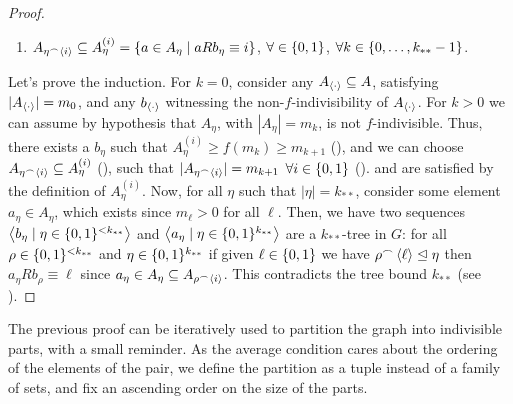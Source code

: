 \begin{lemma}
\begin{proof}
\begin{enumerate}
                    \item\label{itm:existance_of_indivisible_sets.5} $A_{\eta^\frown \left< i \right>} \subseteq A_\eta^{(i)} = \{ a \in A_\eta \mid a R b_\eta \equiv i \}$,
                        $\forall \in \{ 0,1 \}$, $\forall k \in \{ 0, \dots, k_{**}-1 \}$.
                \end{enumerate}
                Let's prove the induction.
                For $k=0$, consider any $A_{\left< \cdot \right>} \subseteq A$, satisfying $|A_{\left< \cdot \right>}| = m_0$, and
                any $b_{\left< \cdot \right>}$ witnessing the non-$f$-indivisibility of $A_{\left< \cdot \right>}$.
                For $k > 0$ we can assume by hypothesis that $A_\eta$, with $|A_\eta| = m_{k}$, is not $f$-indivisible.
                Thus, there exists a $b_\eta$ such that $A_\eta^{(i)} \geq f(m_{k}) \geq m_{k+1}$ (), and we can choose
                $A_{\eta^\frown \left< i \right>} \subseteq A_\eta^{(i)}$ (), such that
                $|A_{\eta^\frown \left< i \right>}| = m_{k+1}$ $\forall i \in \{ 0,1 \}$ ().
                 and  are satisfied by the definition of $A_\eta^{(i)}$.
                Now, for all $\eta$ such that $|\eta| = k_{**}$, consider some element $a_\eta \in A_\eta$, which exists since $m_\ell > 0$
                for all $\ell$.
                Then, we have two sequences $\left< b_\eta \mid \eta \in \{ 0,1 \}^{<k_{**}} \right>$ and $\left< a_\eta \mid \eta \in \{ 0,1 \}^{k_{**}} \right>$
                are a $k_{**}$-tree in $G$: for all $\rho \in \{ 0,1 \}^{<k_{**}}$ and $\eta \in \{ 0,1 \}^{k_{**}}$
                if given $\ell \in \{ 0, 1 \}$ we have $\rho^\frown \left< \ell \right> \trianglelefteq \eta$ then
                $a_\eta R b_\rho \equiv \ell$ since $a_\eta \in A_\eta \subseteq A_{\rho ^\frown \left< i \right>}$.
                This contradicts the tree bound $k_{**}$ (see ).
            \end{proof}
        \end{lemma}

        The previous proof can be iteratively used to partition the graph into indivisible parts, with a small reminder.
        As the average condition cares about the ordering of the elements of the pair, we define the partition as a tuple
        instead of a family of sets, and fix an ascending order on the size of the parts.

